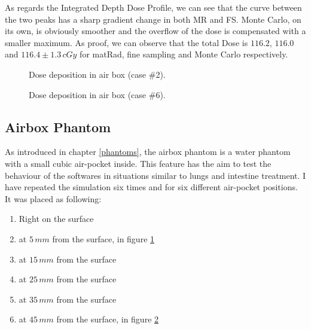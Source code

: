 \documentclass[12pt, a4paper, twoside]{book}
\begin{document}
As regards the Integrated Depth Dose Profile, we can see that the curve between the two peaks has a sharp gradient change in both MR and FS. Monte Carlo, on its own, is obviously smoother and the overflow of the dose is compensated with a smaller maximum. As proof, we can observe that the total Dose is $116.2$, $116.0$ and $116.4\pm1.3\,cGy$ for matRad, fine sampling and Monte Carlo respectively.

\newpage

\begin{figure}[!t]
\centering
{}\quad
{}\quad
{}\quad
\caption{Dose deposition in air box (case \#2).}
\label{fig:AB2}
\end{figure}


\begin{figure}[!t]
\centering
{}\quad
{}\quad
{}\quad
\caption{Dose deposition in air box (case \#6).}
\label{fig:AB6}
\end{figure}

\subsection{Airbox Phantom}\label{air}
As introduced in chapter \ref{phantoms}, the airbox phantom is a water phantom with a small cubic air-pocket inside. This feature has the aim to test the behaviour of the softwares in situations similar to lungs and intestine treatment. 
I have repeated the simulation six times and for six different air-pocket positions. It was placed as following:

\begin{enumerate}
\item Right on the surface
\item at $5\,mm$ from the surface, in figure \ref{fig:AB2}
\item at $15\,mm$ from the surface
\item at $25\,mm$ from the surface
\item at $35\,mm$ from the surface
\item at $45\,mm$ from the surface, in figure \ref{fig:AB6}
\end{enumerate}
\end{document}

